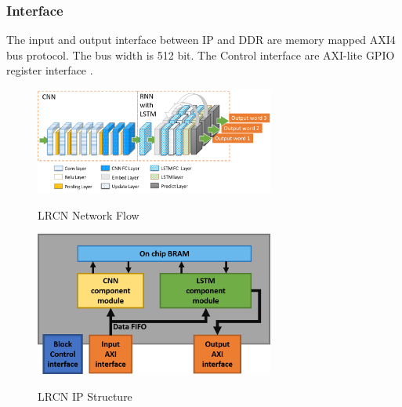 \documentclass[a4paper, 11pt]{article}
\begin{document}
\subsubsection{Interface}
The input and output interface between IP and DDR are memory mapped AXI4 bus protocol. The bus width is 512 bit. The Control interface are AXI-lite GPIO register interface .

\begin{figure}[h]
  \centering
  \includegraphics[width=0.7\textwidth]{LRCN.png}\\
  \vspace{-12pt}
  \caption{LRCN Network Flow}\label{fig:LRCN}
  \vspace{-12pt}
\end{figure}

\begin{figure}[h]
  \centering
  \includegraphics[width=0.7\textwidth]{lrcn_block_diagram.png}\\
  \vspace{-12pt}
  \caption{LRCN IP Structure}\label{fig:LRCN_bd}
  \vspace{-12pt}
\end{figure}
\end{document}
